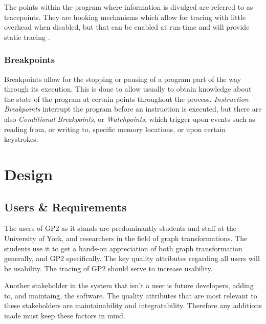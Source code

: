 \documentclass{UoYCSproject}
\begin{document}
The points within the program where information is divulged are referred to as tracepoints. They are hooking mechanisms which allow for tracing with little overhead when disabled, but that can be enabled at run-time and will provide static tracing \cite{tracing_book}.

\subsection{Breakpoints}
Breakpoints allow for the stopping or pausing of a program part of the way through its execution. This is done to allow usually to obtain knowledge about the state of the program at certain points throughout the process. \emph{Instruction Breakpoints} interrupt the program before an instruction is executed, but there are also \emph{Conditional Breakpoints}, or \emph{Watchpoints}, which trigger upon events such as reading from, or writing to, specific memory locations, or upon certain keystrokes.




\chapter{Design}
\section{Users \& Requirements} %

The users of GP2 as it stands are predominantly students and staff at the University of York, and researchers in the field of graph transformations. The students use it to get a hands-on appreciation of both graph transformation generally, and GP2 specifically. The key quality attributes regarding all users will be usability. The tracing of GP2 should serve to increase usability. 

Another stakeholder in the system that isn't a user is future developers, adding to, and maintaing, the software. The quality attributes that are most relevant to these stakeholders are maintainability and integratability. Therefore any additions made must keep these factors in mind.
\end{document}
